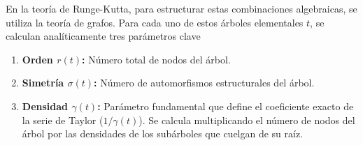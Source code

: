 En la teoría de Runge-Kutta, para estructurar estas combinaciones algebraicas, se utiliza la teoría de grafos. Para cada uno de estos árboles elementales $t$, se calculan analíticamente tres parámetros clave
\begin{enumerate}
    \item \textbf{Orden $r(t)$:} Número total de nodos del árbol.
    \item \textbf{Simetría $\sigma(t)$:} Número de automorfismos estructurales del árbol.
    \item \textbf{Densidad $\gamma(t)$:} Parámetro fundamental que define el coeficiente exacto de la serie de Taylor ($1/\gamma(t)$). Se calcula multiplicando el número de nodos del árbol por las densidades de los subárboles que cuelgan de su raíz.
\end{enumerate}

